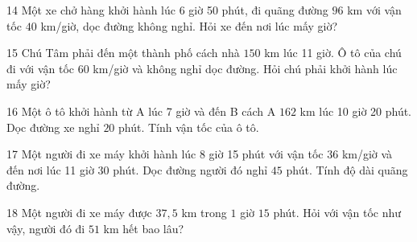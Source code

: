 \gap
\begin{probbox}{14}{\relax}
Một xe chở hàng khởi hành lúc 6 giờ 50 phút, đi quãng đường $96$ km với vận tốc $40$ km/giờ, dọc đường không nghỉ. Hỏi xe đến nơi lúc mấy giờ?
\end{probbox}
\gap
\begin{probbox}{15}{\relax}
Chú Tâm phải đến một thành phố cách nhà $150$ km lúc 11 giờ. Ô tô của chú đi với vận tốc $60$ km/giờ và không nghỉ dọc đường. Hỏi chú phải khởi hành lúc mấy giờ?
\end{probbox}
\gap
\begin{probbox}{16}{\relax}
Một ô tô khởi hành từ A lúc 7 giờ và đến B cách A $162$ km lúc 10 giờ 20 phút. Dọc đường xe nghỉ $20$ phút. Tính vận tốc của ô tô.
\end{probbox}
\gap
\begin{probbox}{17}{\relax}
Một người đi xe máy khởi hành lúc 8 giờ 15 phút với vận tốc $36$ km/giờ và đến nơi lúc 11 giờ 30 phút. Dọc đường người đó nghỉ $45$ phút. Tính độ dài quãng đường.
\end{probbox}
\gap
\begin{probbox}{18}{\relax}
Một người đi xe máy được $37{,}5$ km trong $1$ giờ $15$ phút. Hỏi với vận tốc như vậy, người đó đi $51$ km hết bao lâu?
\end{probbox}
